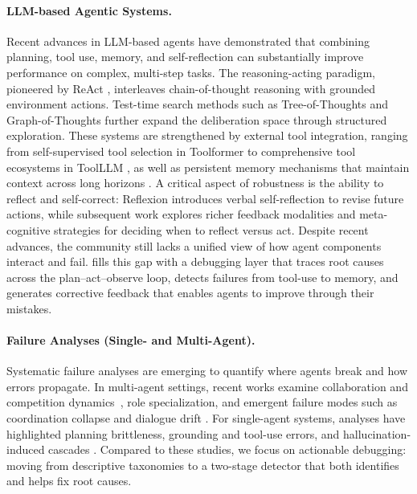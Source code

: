 
\paragraph{LLM-based Agentic Systems.}
Recent advances in LLM-based agents have demonstrated that combining planning, tool use, memory, and self-reflection can substantially improve performance on complex, multi-step tasks. The reasoning-acting paradigm, pioneered by ReAct \citep{yao2022react}, interleaves chain-of-thought reasoning with grounded environment actions. Test-time search methods such as Tree-of-Thoughts \citep{yao2023treeofthoughts} and Graph-of-Thoughts \citep{besta2023graphofthoughts} further expand the deliberation space through structured exploration. These systems are strengthened by external tool integration, ranging from self-supervised tool selection in Toolformer \citep{schick2023toolformer} to comprehensive tool ecosystems in ToolLLM \citep{qin2023toolllm}, as well as persistent memory mechanisms that maintain context across long horizons \citep{packer2023memgpt}. A critical aspect of robustness is the ability to reflect and self-correct: Reflexion \citep{shinn2023reflexion} introduces verbal self-reflection to revise future actions, while subsequent work explores richer feedback modalities and meta-cognitive strategies for deciding when to reflect versus act. Despite recent advances, the community still lacks a unified view of how agent components interact and fail. \ModelName{} fills this gap with a debugging layer that traces root causes across the plan–act–observe loop, detects failures from tool-use to memory, and generates corrective feedback that enables agents to improve through their mistakes.
\vspace{-0.1in}
\paragraph{Failure Analyses (Single- and Multi-Agent).}
Systematic failure analyses are emerging to quantify where agents break and how errors propagate. In multi-agent settings, recent works examine collaboration and competition dynamics~\citep{zhu2025multiagentbench}, role specialization, and emergent failure modes such as coordination collapse and dialogue drift \citep{cemri2025why,zhang2025which,zhu2025multiagentbench,hyun2025crewwildfire,tran2025multiagent}. For single-agent systems, analyses have highlighted planning brittleness, grounding and tool-use errors, and hallucination-induced cascades \citep{ji2024testing,sung2025verila,ning2024defining}. Compared to these studies, we focus on actionable debugging: moving from descriptive taxonomies to a two-stage detector that both identifies and helps fix root causes.
\vspace{-0.1in}
